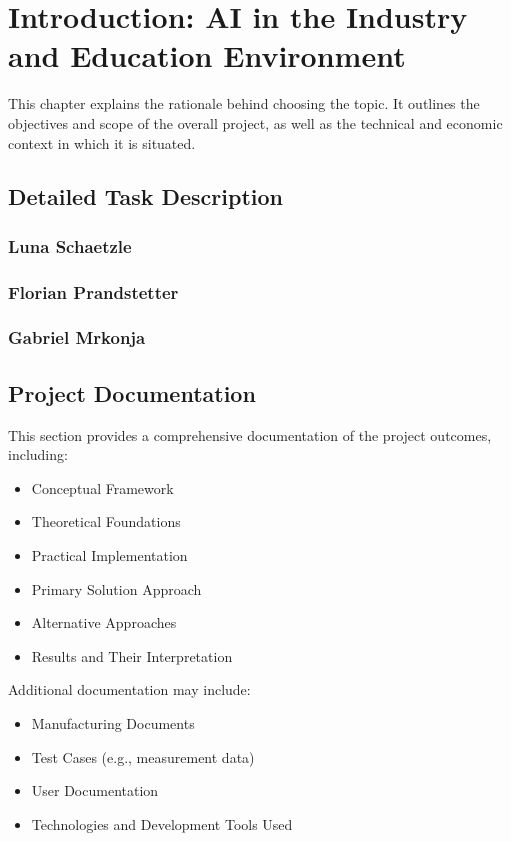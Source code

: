 \chapter{Introduction: AI in the Industry and Education Environment}
\label{chap:introduction}




This chapter explains the rationale behind choosing the topic. It outlines the objectives and scope of the overall project, as well as the technical and economic context in which it is situated.

\section{Detailed Task Description}

\subsection{Luna Schaetzle}

\subsection{Florian Prandstetter}

\subsection{Gabriel Mrkonja}

\section{Project Documentation}

This section provides a comprehensive documentation of the project outcomes, including:

\begin{itemize}
    \item Conceptual Framework
    \item Theoretical Foundations
    \item Practical Implementation
    \item Primary Solution Approach
    \item Alternative Approaches
    \item Results and Their Interpretation
\end{itemize}

Additional documentation may include:

\begin{itemize}
    \item Manufacturing Documents
    \item Test Cases (e.g., measurement data)
    \item User Documentation
    \item Technologies and Development Tools Used
\end{itemize}



